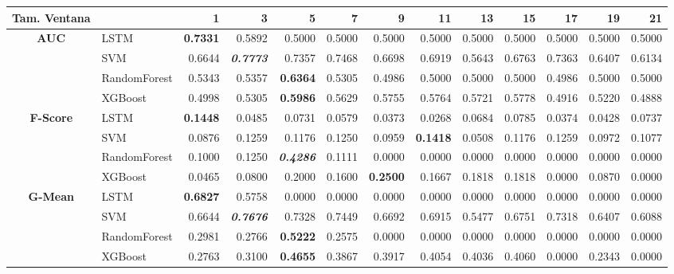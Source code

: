 \begin{table}[H]
	\centering
	\begin{adjustbox}{max width=12cm}
		\begin{tabular}{|c|l|r|r|r|r|r|r|r|r|r|r|r|}
			\hline
			\textbf{Tam. Ventana} &         &      1  &      3  &      5  &      7  &      9  &      11 &      13 &      15 &      17 &      19 &      21 \\
			\hline
			\textbf{AUC} &  LSTM & \textbf{  0.7331 } &  0.5892 &  0.5000 &  0.5000 &  0.5000 &  0.5000 &  0.5000 &  0.5000 &  0.5000 &  0.5000 &  0.5000 \\
			&  SVM &  0.6644 & \textit{ \textbf{  0.7773 } } &  0.7357 &  0.7468 &  0.6698 &  0.6919 &  0.5643 &  0.6763 &  0.7363 &  0.6407 &  0.6134 \\
			&  RandomForest &  0.5343 &  0.5357 & \textbf{  0.6364 } &  0.5305 &  0.4986 &  0.5000 &  0.5000 &  0.5000 &  0.4986 &  0.5000 &  0.5000 \\
			&  XGBoost &  0.4998 &  0.5305 & \textbf{  0.5986 } &  0.5629 &  0.5755 &  0.5764 &  0.5721 &  0.5778 &  0.4916 &  0.5220 &  0.4888 \\
			\hline
			\textbf{F-Score} &  LSTM & \textbf{  0.1448 } &  0.0485 &  0.0731 &  0.0579 &  0.0373 &  0.0268 &  0.0684 &  0.0785 &  0.0374 &  0.0428 &  0.0737 \\
			&  SVM &  0.0876 &  0.1259 &  0.1176 &  0.1250 &  0.0959 & \textbf{  0.1418 } &  0.0508 &  0.1176 &  0.1259 &  0.0972 &  0.1077 \\
			&  RandomForest &  0.1000 &  0.1250 & \textit{ \textbf{  0.4286 } } &  0.1111 &  0.0000 &  0.0000 &  0.0000 &  0.0000 &  0.0000 &  0.0000 &  0.0000 \\
			&  XGBoost &  0.0465 &  0.0800 &  0.2000 &  0.1600 & \textbf{  0.2500 } &  0.1667 &  0.1818 &  0.1818 &  0.0000 &  0.0870 &  0.0000 \\
			\hline
			\textbf{G-Mean} &  LSTM & \textbf{  0.6827 } &  0.5758 &  0.0000 &  0.0000 &  0.0000 &  0.0000 &  0.0000 &  0.0000 &  0.0000 &  0.0000 &  0.0000 \\
			&  SVM &  0.6644 & \textit{ \textbf{  0.7676 } } &  0.7328 &  0.7449 &  0.6692 &  0.6915 &  0.5477 &  0.6751 &  0.7318 &  0.6407 &  0.6088 \\
			&  RandomForest &  0.2981 &  0.2766 & \textbf{  0.5222 } &  0.2575 &  0.0000 &  0.0000 &  0.0000 &  0.0000 &  0.0000 &  0.0000 &  0.0000 \\
			&  XGBoost &  0.2763 &  0.3100 & \textbf{  0.4655 } &  0.3867 &  0.3917 &  0.4054 &  0.4036 &  0.4060 &  0.0000 &  0.2343 &  0.0000 \\

\end{tabular}
\end{adjustbox}
\end{table}
